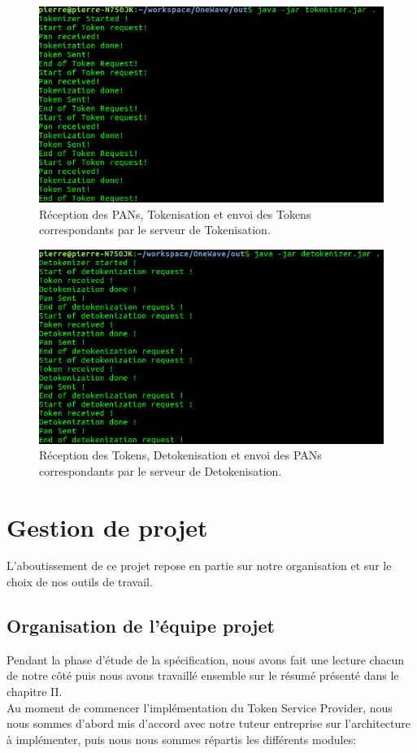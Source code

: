 \documentclass{report}
\begin{document}
\begin{figure}[!ht]
    \centering
			\includegraphics[scale=0.47]{img/serveur_tokenizer.png}
			\caption{\label{Trello} Réception des PANs, Tokenisation et envoi des Tokens correspondants par le serveur de Tokenisation.}			
\end{figure}

\begin{figure}[!ht]
    \centering
			\includegraphics[scale=0.47]{img/serveur_detokenizer.png}
			\caption{\label{Trello} Réception des Tokens, Detokenisation et envoi des PANs correspondants par le serveur de Detokenisation.}			
\end{figure}


\chapter{Gestion de projet}
L'aboutissement de ce projet repose en partie sur notre organisation et sur le choix de nos outils de travail. 

\section{Organisation de l'équipe projet}
Pendant la phase d'étude de la spécification, nous avons fait une lecture chacun de notre côté puis nous avons travaillé ensemble sur le résumé présenté dans le chapitre II.\\
Au moment de commencer l'implémentation du Token Service Provider, nous nous sommes d'abord mis d'accord avec notre tuteur entreprise sur l'architecture à implémenter, puis nous nous sommes répartis les différents modules:\\
\end{document}
